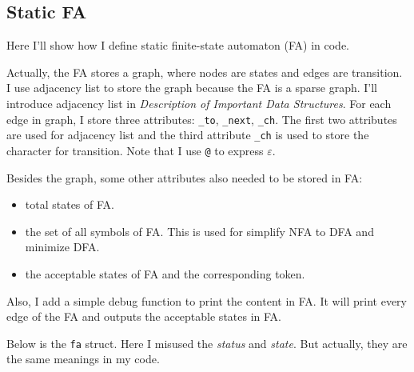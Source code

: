 \documentclass{article}
\begin{document}
\subsection{Static FA}
Here I'll show how I define static finite-state automaton (FA) in code.

Actually, the FA stores a graph, where nodes are states and edges are transition. I use adjacency list to store the graph because the FA is a sparse graph. I'll introduce adjacency list in \textit{Description of Important Data Structures}. For each edge in graph, I store three attributes: \texttt{\_to}, \texttt{\_next}, \texttt{\_ch}. The first two attributes are used for adjacency list and the third attribute \texttt{\_ch} is used to store the character for transition. Note that I use \texttt{@} to express $\varepsilon$.

Besides the graph, some other attributes also needed to be stored in FA:
\begin{itemize}
    \item total states of FA.
    \item the set of all symbols of FA. This is used for simplify NFA to DFA and minimize DFA.
    \item the acceptable states of FA and the corresponding token.
\end{itemize}

Also, I add a simple debug function to print the content in FA. It will print every edge of the FA and outputs the acceptable states in FA.

Below is the \texttt{fa} struct. Here I misused the \textit{status} and \textit{state}. But actually, they are the same meanings in my code.
\end{document}
